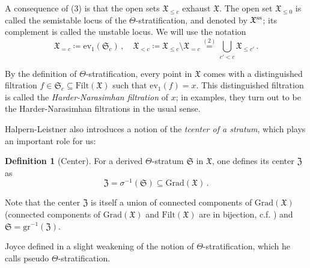 \documentclass[12pt]{amsart}
\theoremstyle{definition}
\newtheorem{definition}{Definition}[section]
\newtheorem{lemma}[definition]{Lemma}
\newcommand{\1}{\mathbf 1}
\newcommand{\FX}{{\mathfrak{X}}}
\newcommand{\FZ}{{\mathfrak{Z}}}
\newcommand{\FS}{{\mathfrak{S}}}
\newcommand{\gr}{\mathrm{gr}}
\renewcommand{\ev}{\mathrm{ev}}
\newcommand{\Grad}{\mathrm{Grad}}
\newcommand{\Filt}{\mathrm{Filt}}
\begin{document}
A consequence of (3) is that the open sets $\FX_{\leq c}$ exhaust $\FX$. The open set $\FX_{\leq 0}$ is called the semistable locus of the $\Theta$-stratification, and denoted by $\FX^{\textup{ss}}$; its complement is called the unstable locus. We will use the notation
\[\FX_{=c}\coloneqq \ev_1(\FS_c)\,,\quad \FX_{<c}\coloneqq \FX_{\leq c}\setminus \FX_{=c}\overset{(2)}{=}\bigcup \limits_{c'<c} \mathfrak X_{\leq c'}\,.\]

By the definition of $\Theta$-stratification, every point in $\FX$ comes with a distinguished filtration $f\in \FS_c\subseteq \Filt(\FX)$ such that $\ev_1(f)=x$. This distinguished filtration is called the \textit{Harder-Narasimhan filtration} of $x$; in examples, they turn out to be the Harder-Narasimhan filtrations in the usual sense.



Halpern-Leistner also introduces a notion of the \textit{tcenter of a stratum}, which plays an important role for us:

\begin{definition}[Center] For a derived $\Theta$-stratum $\FS$ in $\mathfrak X$, one defines its center $\FZ$ as 
\[\FZ=\sigma^{-1}(\FS)\subseteq \Grad(\FX)\,.\] 
\end{definition}
Note that the center $\FZ$ is itself a union of connected components of $\Grad(\FX)$ (connected components of $\Grad(\FX)$ and $\Filt(\FX)$ are in bijection, c.f. \cite[Lemma 1.3.8]{HLstructure}) and $\FS=\gr^{-1}(\FZ)$.

Joyce defined in \cite[Section 3.3.4]{joyce} a slight weakening of the notion of $\Theta$-stratification, which he calls pseudo $\Theta$-stratification. 
\end{document}
